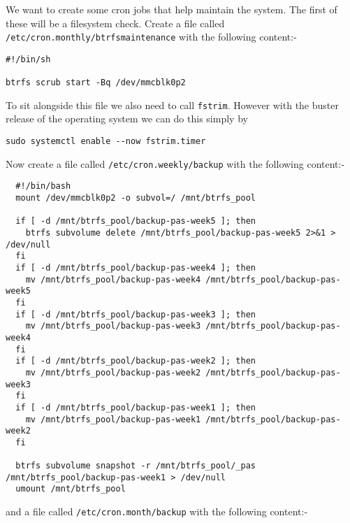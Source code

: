 \documentclass[Draft]{akc}
\begin{document}
We want to create some cron jobs that help maintain the system.  The first of these will be a
filesystem check.  Create a file called \texttt{/etc/cron.monthly/btrfsmaintenance} with the
following content:-

\begin{lstlisting}
#!/bin/sh

btrfs scrub start -Bq /dev/mmcblk0p2

\end{lstlisting}

To sit alongside this file we also need to call \texttt{fstrim}.  However with the buster release of
the operating system we can do this simply by
\begin{lstlisting}
sudo systemctl enable --now fstrim.timer
\end{lstlisting}

Now create a file called \texttt{/etc/cron.weekly/backup} with the following content:-

\begin{lstlisting}
  #!/bin/bash
  mount /dev/mmcblk0p2 -o subvol=/ /mnt/btrfs_pool

  if [ -d /mnt/btrfs_pool/backup-pas-week5 ]; then
    btrfs subvolume delete /mnt/btrfs_pool/backup-pas-week5 2>&1 > /dev/null
  fi
  if [ -d /mnt/btrfs_pool/backup-pas-week4 ]; then
    mv /mnt/btrfs_pool/backup-pas-week4 /mnt/btrfs_pool/backup-pas-week5
  fi
  if [ -d /mnt/btrfs_pool/backup-pas-week3 ]; then
    mv /mnt/btrfs_pool/backup-pas-week3 /mnt/btrfs_pool/backup-pas-week4
  fi
  if [ -d /mnt/btrfs_pool/backup-pas-week2 ]; then
    mv /mnt/btrfs_pool/backup-pas-week2 /mnt/btrfs_pool/backup-pas-week3
  fi
  if [ -d /mnt/btrfs_pool/backup-pas-week1 ]; then
    mv /mnt/btrfs_pool/backup-pas-week1 /mnt/btrfs_pool/backup-pas-week2
  fi

  btrfs subvolume snapshot -r /mnt/btrfs_pool/_pas /mnt/btrfs_pool/backup-pas-week1 > /dev/null
  umount /mnt/btrfs_pool

\end{lstlisting}

and a file called \texttt{/etc/cron.month/backup} with the following content:-
\end{document}
